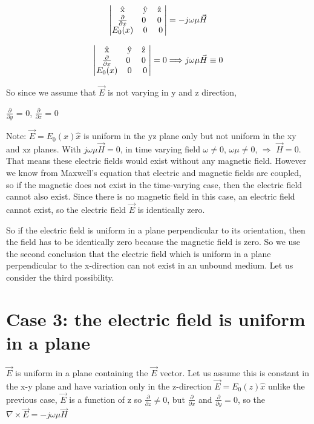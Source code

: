 \[
\begin{vmatrix}
$\^{x}$ & $\^{y}$ & $\^{z} $\\
$$\frac{\partial}{\partial x}$$ & $0 $ & $0 $\\
$$E_{0}(x)$$ & 0 & 0
\end{vmatrix} =
-j\omega \mu \vec{H}
\]




\[
\begin{vmatrix}
$\^{x}$ & $\^{y}$ & $\^{z} $ \\
$$\frac{\partial}{\partial x}$$ & $0 $ & $0 $ \\
$$E_{0}(x)$$ & 0 & 0
\end{vmatrix} =0 \Longrightarrow j\omega\mu\vec{H}\equiv0
\]

So since we assume that $\vec{E}$ is not varying in y and z direction,

$\frac{\partial}{\partial y}$ = 0,
$\frac{\partial}{\partial z}$ = 0

Note: $\vec{E}={E_{0}(x)\hat{x}}$ is uniform in the yz plane only but not uniform in the xy and xz planes. With $j\omega\mu\vec{H}=0$, in time varying field $\omega\neq0$, $\omega\mu\neq0$, $\Longrightarrow$ $\vec{H}=0$. That means these electric fields would exist without any magnetic field. However we know from Maxwell's equation that electric and magnetic fields are coupled, so if the magnetic does not exist in the time-varying case, then the electric field cannot also exist. Since there is no magnetic field in this case, an electric field cannot exist, so the electric field $\vec{E}$ is identically zero.

So if the electric field is uniform in a plane perpendicular to its orientation, then the field has to be identically zero because the magnetic field is zero. So we use the second conclusion that the electric field which is uniform in a plane perpendicular to the x-direction can not exist in an unbound medium. Let us consider the third possibility.

\section{Case 3: the electric field is uniform in a plane}
$\vec{E}$ is uniform in a plane containing the $\vec{E}$ vector. Let us assume this is constant in the x-y plane and have variation only in the z-direction $\vec{E}=E_{0}(z)\hat{x}$ unlike the previous case, $\vec{E}$ is a function of z so $\frac{\partial}{\partial z}\neq0$, but $\frac{\partial}{\partial x}$ and $\frac{\partial}{\partial y}=0$, so the $\nabla\times\vec{E}=-j\omega\mu\vec{H}$


